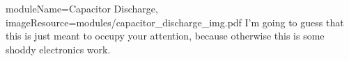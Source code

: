 \begin{needymodule}{
  moduleName=Capacitor Discharge,
  imageResource=modules/capacitor_discharge_img.pdf
}
{
  I'm going to guess that this is just meant to occupy your attention, because otherwise this is some shoddy electronics work.
}
  \begin{bulletlist}
  \end{bulletlist}

\end{needymodule}
